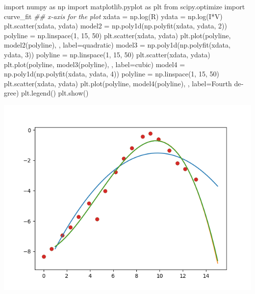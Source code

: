 \documentclass{article}
\newenvironment{Shaded}{}{}
\newcommand{\CommentTok}[1]{\textcolor[rgb]{0.38,0.63,0.69}{\textit{#1}}}
\newcommand{\DecValTok}[1]{\textcolor[rgb]{0.25,0.63,0.44}{#1}}
\newcommand{\ImportTok}[1]{#1}
\newcommand{\NormalTok}[1]{#1}
\newcommand{\OperatorTok}[1]{\textcolor[rgb]{0.40,0.40,0.40}{#1}}
\newcommand{\StringTok}[1]{\textcolor[rgb]{0.25,0.44,0.63}{#1}}
\begin{document}
\begin{latin}
\begin{Shaded}
\begin{Highlighting}[]
\ImportTok{import}\NormalTok{ numpy }\ImportTok{as}\NormalTok{ np}
\ImportTok{import}\NormalTok{ matplotlib.pyplot }\ImportTok{as}\NormalTok{ plt}
\ImportTok{from}\NormalTok{ scipy.optimize }\ImportTok{import}\NormalTok{ curve\_fit}
\CommentTok{\#\# x{-}axis for the plot}
\NormalTok{xdata }\OperatorTok{=}\NormalTok{ np.log(R)}
\NormalTok{ydata }\OperatorTok{=}\NormalTok{ np.log(I}\OperatorTok{*}\NormalTok{V)}
\NormalTok{plt.scatter(xdata, ydata)}
\NormalTok{model2 }\OperatorTok{=}\NormalTok{ np.poly1d(np.polyfit(xdata, ydata, }\DecValTok{2}\NormalTok{))}
\NormalTok{polyline }\OperatorTok{=}\NormalTok{ np.linspace(}\DecValTok{1}\NormalTok{, }\DecValTok{15}\NormalTok{, }\DecValTok{50}\NormalTok{)}
\NormalTok{plt.scatter(xdata, ydata)}
\NormalTok{plt.plot(polyline, model2(polyline),  }\StringTok{\textquotesingle{}{-}\textquotesingle{}}\NormalTok{, label}\OperatorTok{=}\StringTok{\textquotesingle{}quadratic\textquotesingle{}}\NormalTok{)}
\NormalTok{model3 }\OperatorTok{=}\NormalTok{ np.poly1d(np.polyfit(xdata, ydata, }\DecValTok{3}\NormalTok{))}
\NormalTok{polyline }\OperatorTok{=}\NormalTok{ np.linspace(}\DecValTok{1}\NormalTok{, }\DecValTok{15}\NormalTok{, }\DecValTok{50}\NormalTok{)}
\NormalTok{plt.scatter(xdata, ydata)}
\NormalTok{plt.plot(polyline, model3(polyline),  }\StringTok{\textquotesingle{}{-}\textquotesingle{}}\NormalTok{, label}\OperatorTok{=}\StringTok{\textquotesingle{}cubic\textquotesingle{}}\NormalTok{)}
\NormalTok{model4 }\OperatorTok{=}\NormalTok{ np.poly1d(np.polyfit(xdata, ydata, }\DecValTok{4}\NormalTok{))}
\NormalTok{polyline }\OperatorTok{=}\NormalTok{ np.linspace(}\DecValTok{1}\NormalTok{, }\DecValTok{15}\NormalTok{, }\DecValTok{50}\NormalTok{)}
\NormalTok{plt.scatter(xdata, ydata)}
\NormalTok{plt.plot(polyline, model4(polyline),  }\StringTok{\textquotesingle{}{-}\textquotesingle{}}\NormalTok{, label}\OperatorTok{=}\StringTok{\textquotesingle{}Fourth degree\textquotesingle{}}\NormalTok{)}
\NormalTok{plt.legend()}
\NormalTok{plt.show()}
\end{Highlighting}
\end{Shaded}
\begin{center}
\includegraphics[scale=0.75]{quadratic, cubic, Fourth degree, curve fit.png}	

\end{center}
\end{latin}
\end{document}

